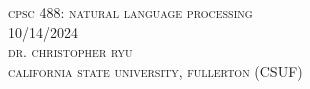 \documentclass[twocolumn,12pt]{article}
\begin{document}
\onecolumn
\\~\\

\textsc{cpsc 488: natural language processing}\\
\textsc{10/14/2024}\\
\textsc{dr. christopher ryu}\\
\textsc{california state university, fullerton (CSUF)}\\~\\
\end{document}
